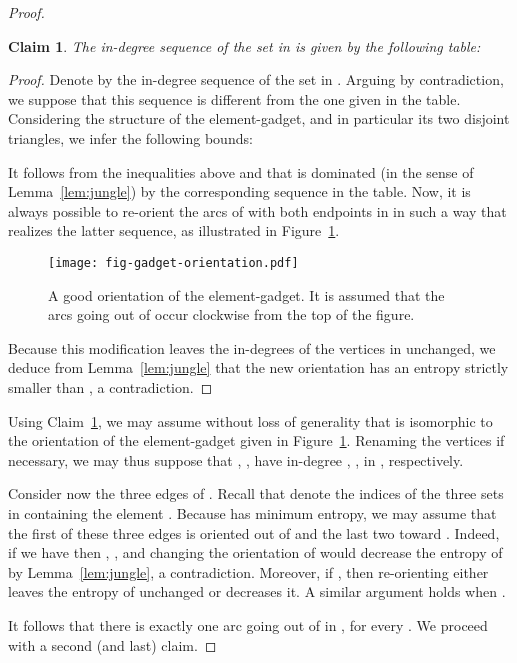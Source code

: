 \documentclass[11pt]{article}
\newtheorem{claim}{Claim}
\begin{document}
\begin{proof}
\begin{claim}
\label{claim-gadget}
The in-degree sequence of the set  in  is given by the following table:

\end{claim}
\begin{proof}
Denote by  the in-degree sequence of the set  in . Arguing by contradiction, we suppose that this sequence is different from the one given in the table.  Considering the structure of the element-gadget, and in particular its two disjoint triangles, we infer the following bounds:

It follows from the inequalities above and  that  is dominated (in the sense of Lemma~\ref{lem:jungle}) by the corresponding sequence in the table. Now, it is always possible to re-orient the arcs of  with both endpoints in  in such a way that   realizes the latter sequence, as illustrated in Figure~\ref{fig-gadget-orientation}. 
\begin{figure}
\centering
\texttt{[image: fig-gadget-orientation.pdf]}
\caption{\label{fig-gadget-orientation}A good orientation of the element-gadget. It is assumed that the arcs going out of  occur clockwise from the top of the figure.}
\end{figure}
Because this modification leaves the in-degrees of the vertices in  unchanged, we deduce from Lemma~\ref{lem:jungle} that the new orientation has an entropy strictly smaller than , a contradiction.
\end{proof}

Using Claim~\ref{claim-gadget}, we may assume without loss of generality that  is isomorphic to the orientation of the element-gadget given in Figure~\ref{fig-gadget-orientation}. 
Renaming the vertices if necessary, we may thus suppose that , ,  have in-degree , ,  in , respectively.

Consider now the three edges  of . Recall that  denote the indices of the three sets in  containing the element . Because  has minimum entropy, we may assume that the first of these three edges is oriented out of  and the last two toward . Indeed, if we have  then , , and changing the orientation of  would decrease the entropy of  by Lemma~\ref{lem:jungle}, a contradiction. Moreover, if , then re-orienting  either leaves the entropy of  unchanged or decreases it. A similar argument holds when .

It follows that there is exactly one arc going out of  in , for every . We proceed with a second (and last) claim.


\end{proof}
\end{document}
